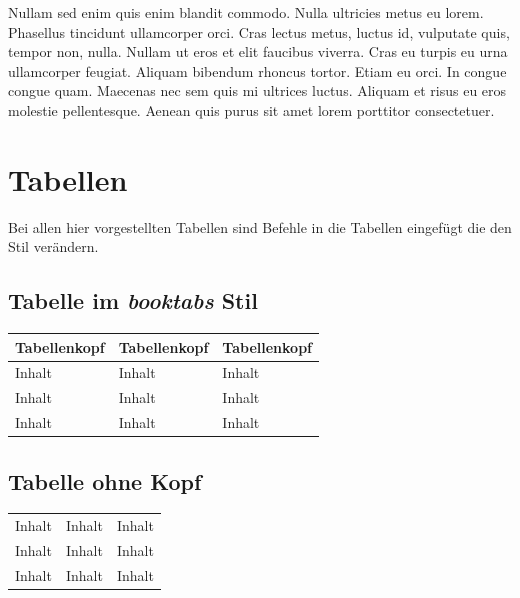 Nullam sed enim quis enim blandit commodo. Nulla ultricies metus eu lorem. Phasellus tincidunt ullamcorper orci. Cras lectus metus, luctus id, vulputate quis, tempor non, nulla. Nullam ut eros et elit faucibus viverra. Cras eu turpis eu urna ullamcorper feugiat. Aliquam bibendum rhoncus tortor. Etiam eu orci. In congue congue quam. Maecenas nec sem quis mi ultrices luctus. Aliquam et risus eu eros molestie pellentesque. Aenean quis purus sit amet lorem porttitor consectetuer.
%

\section{Tabellen}

Bei allen hier vorgestellten Tabellen sind Befehle in die Tabellen eingefügt 
die den Stil verändern.

%
\subsection{Tabelle im \emph{booktabs} Stil}
%
\begin{table}[H]
\sffamily\small\renewcommand{\arraystretch}{1.4}
\begin{tabular}{lll}
\toprule
   Tabellenkopf &
   Tabellenkopf &
   Tabellenkopf \tabularnewline
\midrule
Inhalt & Inhalt  & Inhalt \tabularnewline
Inhalt & Inhalt  & Inhalt \tabularnewline
Inhalt & Inhalt  & Inhalt \tabularnewline
\bottomrule
\end{tabular}
\end{table}
%


\subsection{Tabelle ohne Kopf}

\begin{table}[H]
\sffamily\small\renewcommand{\arraystretch}{1.4}
\begin{tabular}{lll}
\hline
Inhalt & Inhalt  & Inhalt \tabularnewline
Inhalt & Inhalt  & Inhalt \tabularnewline
Inhalt & Inhalt  & Inhalt \tabularnewline
\hline
\end{tabular}
\end{table}

%
